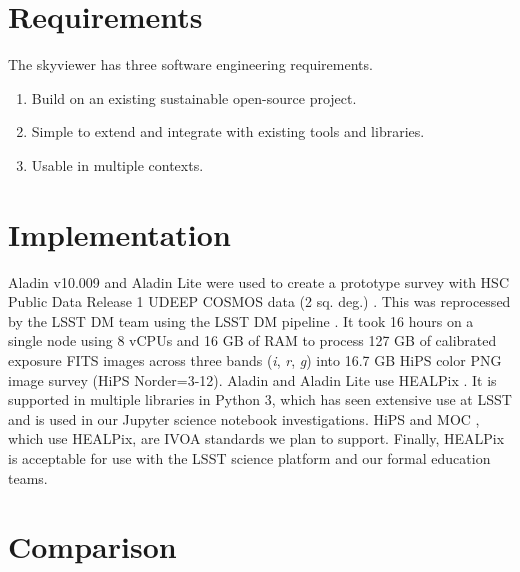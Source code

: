 \documentclass[11pt,twoside]{article}
\begin{document}

\section{Requirements}
The skyviewer has three software engineering requirements.
\begin{enumerate}
\item Build on an existing sustainable open-source project.
\item Simple to extend and integrate with existing tools and libraries.
\item Usable in multiple contexts.
\end{enumerate}

\section{Implementation}
Aladin v10.009 and Aladin Lite were used to create a prototype survey with HSC Public Data Release 1 UDEEP COSMOS data (2 sq. deg.) \citep{2017arXiv170208449A}. This was reprocessed by the LSST DM team using the LSST DM pipeline \citep{2015arXiv151207914J}. It took 16 hours on a single node using 8 vCPUs and 16 GB of RAM to process 127 GB of calibrated exposure FITS images across three bands (\emph{i}, \emph{r}, \emph{g}) into 16.7 GB HiPS \citep{2015A&A...578A.114F} color PNG image survey (HiPS Norder=3-12).
Aladin and Aladin Lite use HEALPix \citep{2007MNRAS.381..865C}. It is supported in multiple libraries in Python 3, which has seen extensive use at LSST \citep{P1-123_adassxxvii} and is used in our Jupyter \citep{PER-GRA:2007} science notebook investigations. HiPS and MOC \citep{2015A&A...578A.114F}, which use HEALPix, are IVOA standards we plan to support. Finally, HEALPix is acceptable for use with the LSST science platform and our formal education teams.

\section{Comparison}
\end{document}

